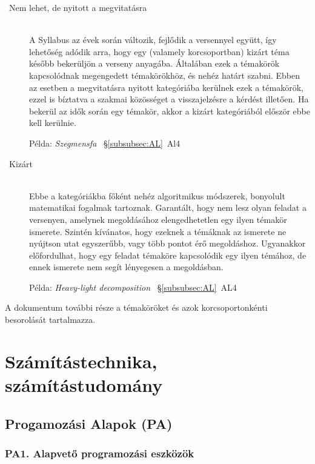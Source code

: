 \documentclass[a4paper,11pt,oneside]{article}
\newcommand{\xmark}{\ding{55}}%
\newcommand{\cemay}{{\small\xmark\faQuestionCircle}}
\newcommand{\cexcl}{{\small\xmark}}
\begin{document}
\begin{description}
\item[\cexcl\ Nem lehet, de nyitott a megvitatásra]~\\
    A Syllabus az évek során változik, fejlődik a versennyel együtt, így lehetőség
    adódik arra, hogy egy (valamely korcsoportban) kizárt téma később bekerüljön
    a verseny anyagába. Általában ezek a témakörök kapcsolódnak megengedett témakörökhöz,
    és nehéz határt szabni. Ebben az esetben a megvitatásra nyitott kategóriába kerülnek
    ezek a témakörök, ezzel is bíztatva a szakmai közösséget a visszajelzésre a kérdést illetően.
    Ha bekerül az idők során egy témakör, akkor a kizárt kategóriából először ebbe kell kerülnie.
    
    Példa: \emph{Szegmensfa\/} ~\S\ref{subsubsec:AL}~Al4

\item[\cemay\ Kizárt]~\\
    Ebbe a kategóriákba főként nehéz algoritmikus módszerek, bonyolult matematikai fogalmak
    tartoznak. Garantált, hogy nem lesz olyan feladat a versenyen, amelynek megoldásához
    elengedhetetlen egy ilyen témakör ismerete. Szintén kívánatos, hogy ezeknek a témáknak
    az ismerete ne nyújtson utat egyszerűbb, vagy több pontot érő megoldáshoz. Ugyanakkor
    előfordulhat, hogy egy feladat témaköre kapcsolódik egy ilyen témához, de ennek ismerete
    nem segít lényegesen a megoldásban.

    Példa: \emph{Heavy-light decomposition} ~\S\ref{subsubsec:AL}~AL4

\end{description}

\bigskip

\noindent
A dokumentum további része a témaköröket és azok korcsoportonkénti besorolását tartalmazza.


\section {Számítástechnika, számítástudomány} %
\label{subsec:computing-science}

\subsection {Progamozási Alapok (PA)} %
\label{subsubsec:PF}

\subsubsection*{PA1. Alapvető programozási eszközök} %
\end{document}
